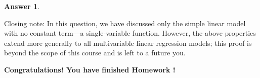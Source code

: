\documentclass[addpoints, 12pt]{exam}
\theoremstyle{definition}
\newtheorem*{answer}{Answer}
\begin{document}
\begin{questions}
\begin{parts}
   \begin{shaded}
    \begin{answer}


    \end{answer}
    \end{shaded}

\end{parts}

\vspace*{1em}
\small{
Closing note: In this question, we have discussed only the simple linear model with no constant term---a single-variable function. However, the above properties extend more generally to all multivariable linear regression models; this proof is beyond the scope of this course and is left to a future you.
}
\end{questions}

\vfill
\begin{center}
    \textbf{
    Congratulations! You have finished Homework \homework{}!
    }
\end{center}
\end{document}
